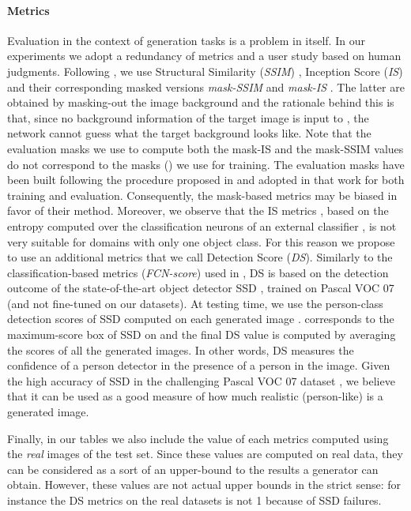 \documentclass[10pt,twocolumn,letterpaper]{article}
\begin{document}
\paragraph{Metrics}
Evaluation  in the context of generation tasks is a problem in itself. In our experiments 
 we adopt a redundancy of  metrics and a user study based on human judgments.
Following \cite{ma2017pose}, we use  Structural Similarity (\emph{SSIM}) \cite{wang2004image},  Inception Score (\emph{IS}) \cite{salimans2016improved} and their corresponding masked versions \emph{mask-SSIM} and \emph{mask-IS} \cite{ma2017pose}. The latter are obtained by masking-out the image background and the rationale behind this is that, since no background information of the target image is input to , the network cannot guess what the target background looks like.  
Note that the evaluation masks we use to compute both the mask-IS and the mask-SSIM values do not correspond to the masks () we use for training. The evaluation masks have been built following the procedure proposed in \cite{ma2017pose} and adopted in that work for both  training and evaluation. Consequently, the mask-based metrics may be biased in favor of their method.
Moreover, we observe that
 the IS metrics  \cite{salimans2016improved}, based on the entropy computed over the classification neurons of an external classifier 
\cite{DBLP:journals/corr/SzegedyVISW15}, 
is not very suitable for
domains with only one object class. 
 For this reason we propose to  use an additional metrics that we call Detection Score (\emph{DS}). Similarly to the classification-based metrics ({\em FCN-score}) used in \cite{pix2pix2016}, DS is based on the detection outcome of
the state-of-the-art object detector SSD \cite{liu2016ssd},
trained on Pascal VOC 07 \cite{pascal-voc-2007} (and not fine-tuned on our datasets).
At testing time, we use the person-class detection scores of SSD 
computed on each generated image .
  corresponds to the maximum-score box of SSD on  and the final DS value is computed by averaging the scores of all the generated images. In other words, DS measures the confidence of a person detector in the presence of a person in the image. Given the high accuracy of SSD in the challenging Pascal VOC 07 dataset \cite{liu2016ssd}, we believe that it can be used as a good measure of how much realistic (person-like) is a generated image.


Finally, in our tables we also include  the value of each metrics computed using the {\em real} images of the test set. Since these  values are computed on real data, they can be considered as a sort of an upper-bound to the results a generator can obtain. However, these  values are not actual upper bounds in the strict sense: for instance the DS metrics on the real datasets is not 1 because of SSD failures. 
\end{document}
